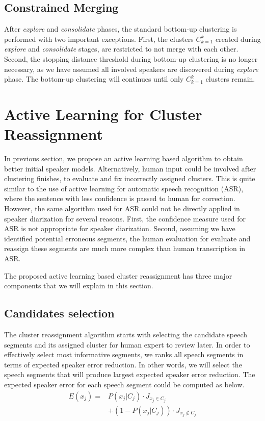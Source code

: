 \documentclass[journal]{IEEEtran}
\begin{document}
\subsection{Constrained Merging}
After \textit{explore} and \textit{consolidate} phases, the standard bottom-up clustering is performed with two important exceptions. First, the clusters $C_{k=1}^{k}$ created during \textit{explore} and \textit{consolidate} stages, are restricted to not merge with each other. Second, the stopping distance threshold during bottom-up clustering is no longer necessary, as we have assumed all involved speakers are discovered during \textit{explore} phase. The bottom-up clustering will continues until only $C_{k=1}^{k}$ clusters remain.

\section{Active Learning for Cluster Reassignment}
In previous section, we propose an active learning based algorithm to obtain better initial speaker models. Alternatively, human input could be involved after clustering finishes, to evaluate and fix incorrectly assigned clusters. This is quite similar to the use of active learning for automatic speech recognition (ASR), where the sentence with less confidence is passed to human for correction. However, the same algorithm used for ASR could not be directly applied in speaker diarization for several reasons. First, the confidence measure used for ASR is not appropriate for speaker diarization. Second, assuming we have identified potential erroneous segments, the human evaluation for evaluate and reassign these segments are much more complex than human transcription in ASR.

The proposed active learning based cluster reassignment has three major components that we will explain in this section. 

\subsection{Candidates selection}
The cluster reassignment algorithm starts with selecting the candidate speech segments and its assigned cluster for human expert to review later. In order to effectively select most informative segments, we ranks all speech segments in terms of expected speaker error reduction. In other words, we will select the speech segments that will produce largest expected speaker error reduction. 
The expected speaker error for each speech segment could be computed as below. 
\begin{equation}
\begin{aligned}
E(x_j) =& P(x_j | C_j) \cdot J_{x_j \in C_j} \\
&+ (1 - P(x_j | C_j)) \cdot J_{x_j \notin C_j}
\label{expect}
\end{aligned}
\end{equation}
\end{document}
